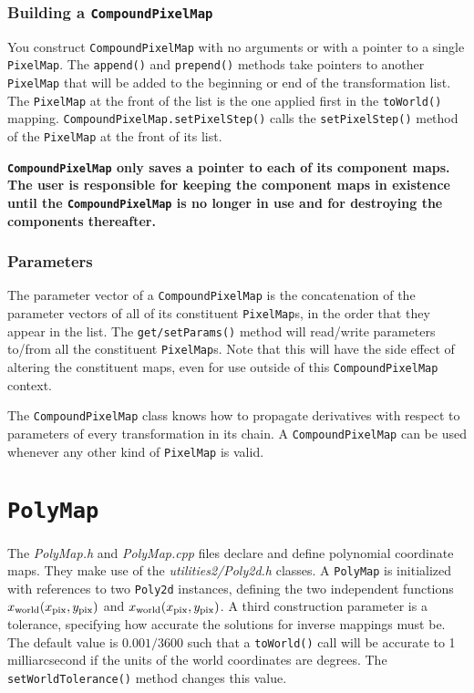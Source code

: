 \documentclass[11pt,preprint,flushrt]{aastex}
\begin{document}
\subsubsection{Building a {\tt CompoundPixelMap}}
You construct {\tt CompoundPixelMap} with no arguments or with a pointer to a single {\tt PixelMap}.  The {\tt append()} and {\tt prepend()} methods take pointers to another {\tt PixelMap} that will be added to the beginning or end of the transformation list.  The {\tt PixelMap} at the front of the list is the one applied first in the {\tt toWorld()} mapping.   {\tt CompoundPixelMap.setPixelStep()} calls the {\tt setPixelStep()} method of the {\tt PixelMap} at the front of its list.

{\bf {\tt CompoundPixelMap} only saves a pointer to each of its component maps.  The user is responsible for keeping the component maps in existence until the {\tt CompoundPixelMap} is no longer in use and for destroying the components thereafter.}

\subsubsection{Parameters}
The parameter vector of a {\tt CompoundPixelMap} is the concatenation of the parameter vectors of all of its constituent {\tt PixelMap}s, in the order that they appear in the list.  The {\tt get/setParams()} method will read/write parameters to/from all the constituent {\tt PixelMap}s.  Note that this will have the side effect of altering the constituent maps, even for use outside of this {\tt CompoundPixelMap} context.

The {\tt CompoundPixelMap} class knows how to propagate derivatives with respect to parameters of every transformation in its chain.  A {\tt CompoundPixelMap} can be used whenever any other kind of {\tt PixelMap} is valid.

\section{{\tt PolyMap}}
The {\it PolyMap.h} and {\it PolyMap.cpp} files declare and define polynomial coordinate maps.  They make use of the {\it utilities2/Poly2d.h} classes.  A {\tt PolyMap} is initialized with references to two {\tt Poly2d} instances, defining the two independent functions $x_{\rm world}(x_{\rm pix},y_{\rm pix})$  and $x_{\rm world}(x_{\rm pix},y_{\rm pix})$.  A third construction parameter is a tolerance, specifying how accurate the solutions for inverse mappings must be.  The default value is $0.001/3600$ such that a {\tt toWorld()} call will be accurate to 1 milliarcsecond if the units of the world coordinates are degrees.  The {\tt setWorldTolerance()} method changes this value.
\end{document}
